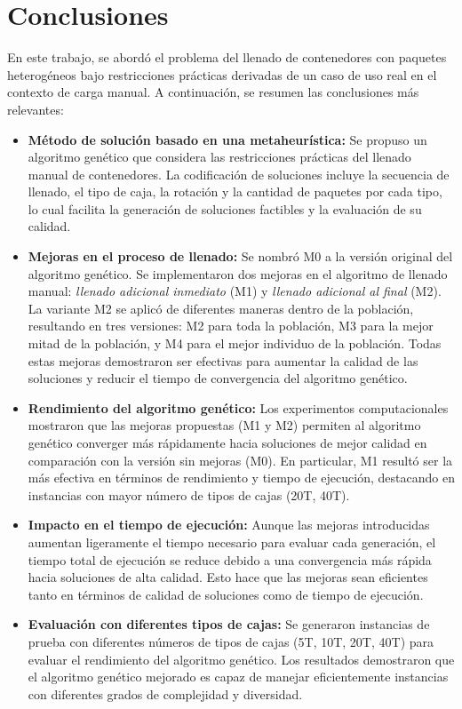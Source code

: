 \section{Conclusiones}

En este trabajo, se abordó el problema del llenado de contenedores con paquetes heterogéneos bajo restricciones prácticas derivadas de un caso de uso real en el contexto de carga manual. A continuación, se resumen las conclusiones más relevantes:

\begin{itemize}
    \item \textbf{Método de solución basado en una metaheurística:} Se propuso un algoritmo genético que considera las restricciones prácticas del llenado manual de contenedores. La codificación de soluciones incluye la secuencia de llenado, el tipo de caja, la rotación y la cantidad de paquetes por cada tipo, lo cual facilita la generación de soluciones factibles y la evaluación de su calidad.
    \item \textbf{Mejoras en el proceso de llenado:} Se nombró M0 a la versión original del algoritmo genético. Se implementaron dos mejoras en el algoritmo de llenado manual: \textit{llenado adicional inmediato} (M1) y \textit{llenado adicional al final} (M2). La variante M2 se aplicó de diferentes maneras dentro de la población, resultando en tres versiones: M2 para toda la población, M3 para la mejor mitad de la población, y M4 para el mejor individuo de la población. Todas estas mejoras demostraron ser efectivas para aumentar la calidad de las soluciones y reducir el tiempo de convergencia del algoritmo genético.

    \item \textbf{Rendimiento del algoritmo genético:} Los experimentos computacionales mostraron que las mejoras propuestas (M1 y M2) permiten al algoritmo genético converger más rápidamente hacia soluciones de mejor calidad en comparación con la versión sin mejoras (M0). En particular, M1 resultó ser la más efectiva en términos de rendimiento y tiempo de ejecución, destacando en instancias con mayor número de tipos de cajas (20T, 40T).

    \item \textbf{Impacto en el tiempo de ejecución:} Aunque las mejoras introducidas aumentan ligeramente el tiempo necesario para evaluar cada generación, el tiempo total de ejecución se reduce debido a una convergencia más rápida hacia soluciones de alta calidad. Esto hace que las mejoras sean eficientes tanto en términos de calidad de soluciones como de tiempo de ejecución.

    \item \textbf{Evaluación con diferentes tipos de cajas:} Se generaron instancias de prueba con diferentes números de tipos de cajas (5T, 10T, 20T, 40T) para evaluar el rendimiento del algoritmo genético. Los resultados demostraron que el algoritmo genético mejorado es capaz de manejar eficientemente instancias con diferentes grados de complejidad y diversidad.
\end{itemize}

